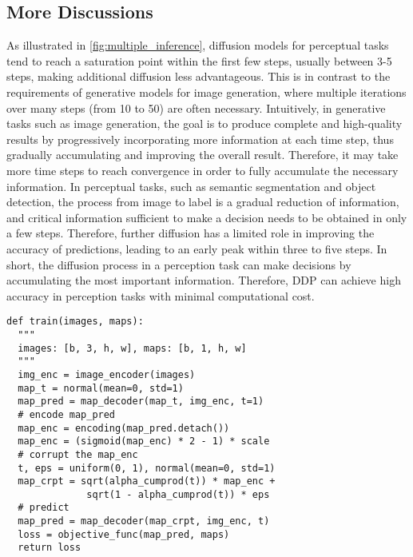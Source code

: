\documentclass[10pt,twocolumn,letterpaper]{article}
\newcommand{\ours}[0]{DDP\xspace}
\begin{document}
\subsection{More Discussions}

As illustrated in \cref{fig:multiple_inference}, diffusion models for perceptual tasks tend to reach a saturation point within the first few steps, usually between 3-5 steps, making additional diffusion less advantageous. This is in contrast to the requirements of generative models for image generation, where multiple iterations over many steps (from 10 to 50) are often necessary.
Intuitively, in generative tasks such as image generation, the goal is to produce complete and high-quality results by progressively incorporating more information at each time step, thus gradually accumulating and improving the overall result.
Therefore, it may take more time steps to reach convergence in order to fully accumulate the necessary information.
In perceptual tasks, such as semantic segmentation and object detection, the process from image to label is a gradual reduction of information, and critical information sufficient to make a decision needs to be obtained in only a few steps. Therefore, further diffusion has a limited role in improving the accuracy of predictions, leading to an early peak within three to five steps.
In short, the diffusion process in a perception task can make decisions by accumulating the most important information. Therefore, DDP can achieve high accuracy in perception tasks with minimal computational cost.

\begin{algorithm}[t!]
\caption{ \ours Self-aligned Denoising}
\label{algo:ddp:self}
\lstset{language=Python}
\begin{lstlisting}[mathescape,xleftmargin=-1em]
def train(images, maps):
  """
  images: [b, 3, h, w], maps: [b, 1, h, w]
  """
  img_enc = image_encoder(images)
  map_t = normal(mean=0, std=1)
  map_pred = map_decoder(map_t, img_enc, t=1)
  # encode map_pred
  map_enc = encoding(map_pred.detach())
  map_enc = (sigmoid(map_enc) * 2 - 1) * scale
  # corrupt the map_enc
  t, eps = uniform(0, 1), normal(mean=0, std=1)
  map_crpt = sqrt(alpha_cumprod(t)) * map_enc +
              sqrt(1 - alpha_cumprod(t)) * eps
  # predict
  map_pred = map_decoder(map_crpt, img_enc, t)
  loss = objective_func(map_pred, maps)
  return loss
\end{lstlisting}
\end{algorithm}
\end{document}
